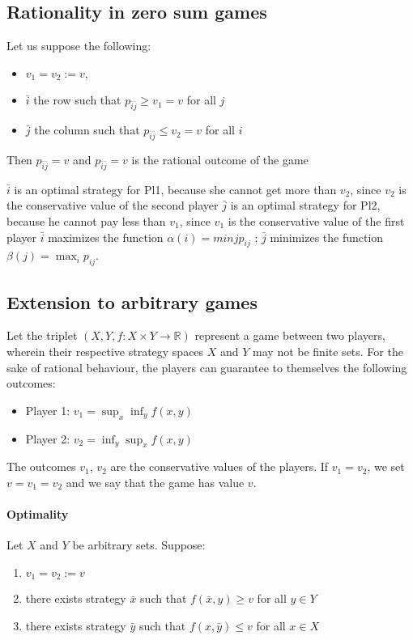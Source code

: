 \subsection{Rationality in zero sum games}
Let us suppose the following: 
\begin{itemize}
    \item $v_1 = v_2 := v$,
    \item $\bar{i}$ the row such that $p_{\bar{i}\bar{j}} \geq v_1 = v$ for all $j$
    \item $\bar{j}$ the column such that $p_{\bar{i}\bar{j}} \leq v_2 = v$ for all $i$
\end{itemize}

Then $p_{\bar{i}\bar{j}} = v$ and $p_{\bar{i}\bar{j}} = v$ is the rational outcome of the game

$\bar{i}$ is an optimal strategy for Pl1, because she cannot get more than $v_2$, since $v_2$ is the conservative value of the second player
$\bar{j}$ is an optimal strategy for Pl2, because he cannot pay less than $v_1$, since $v_1$ is the conservative value of the first player
$\bar{i}$ maximizes the function $\alpha(i) = minj p_{ij}$ ; $\bar{j}$ minimizes the function $\beta(j) = \max_i p_{ij}$.

\subsection{Extension to arbitrary games}
Let the triplet $(X, Y , f : X \times Y \rightarrow \mathbb{R})$ represent a game between two players, wherein their respective strategy spaces $X$ and $Y$ may not be finite sets.
For the sake of rational behaviour, the players can guarantee to themselves the following outcomes:
\begin{itemize}
    \item Player 1: $v_1 = \sup_x\inf_y f (x, y)$
    \item Player 2: $v_2 = \inf_y \sup_xf (x, y)$
\end{itemize}

The outcomes $v_1$, $v_2$ are the conservative values of the players.
If $v_1 = v_2$, we set $v = v_1 = v_2$ and we say that the game has value $v$.

\paragraph*{Optimality}
Let $X$ and $Y$ be arbitrary sets. 
Suppose:
\begin{enumerate}
    \item $v_1 = v_2 := v$
    \item there exists strategy $\bar{x}$ such that $f (\bar{x}, y) \geq v$ for all $y \in Y$
    \item there exists strategy $\bar{y}$ such that $f (x, \bar{y}) \leq v$ for all $x \in X$
\end{enumerate}

